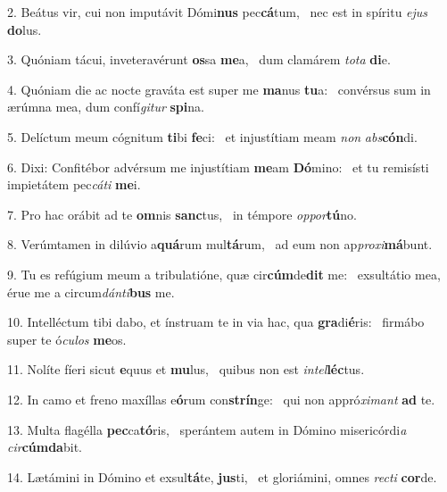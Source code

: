 2. Beátus vir, cui non imputávit Dómi\textbf{nus} pec\textbf{cá}tum, \ast\  nec est in spíritu \textit{e}\textit{jus} \textbf{do}lus.\

3. Quóniam tácui, inveteravérunt \textbf{os}sa \textbf{me}a, \ast\  dum clamárem \textit{to}\textit{ta} \textbf{di}e.\

4. Quóniam die ac nocte graváta est super me \textbf{ma}nus \textbf{tu}a: \ast\  convérsus sum in ærúmna mea, dum confí\textit{gi}\textit{tur} \textbf{spi}na.\

5. Delíctum meum cógnitum \textbf{ti}bi \textbf{fe}ci: \ast\  et injustítiam meam \textit{non} \textit{abs}\textbf{cón}di.\

6. Dixi: Confitébor advérsum me injustítiam \textbf{me}am \textbf{Dó}mino: \ast\  et tu remisísti impietátem pec\textit{cá}\textit{ti} \textbf{me}i.\

7. Pro hac orábit ad te \textbf{om}nis \textbf{sanc}tus, \ast\  in témpore \textit{op}\textit{por}\textbf{tú}no.\

8. Verúmtamen in dilúvio a\textbf{quá}rum mul\textbf{tá}rum, \ast\  ad eum non ap\textit{pro}\textit{xi}\textbf{má}bunt.\

9. Tu es refúgium meum a tribulatióne, quæ cir\textbf{cúm}de\textbf{dit} me: \ast\  exsultátio mea, érue me a circum\textit{dán}\textit{ti}\textbf{bus} me.\

10. Intelléctum tibi dabo, et ínstruam te in via hac, qua \textbf{gra}di\textbf{é}ris: \ast\  firmábo super te ó\textit{cu}\textit{los} \textbf{me}os.\

11. Nolíte fíeri sicut \textbf{e}quus et \textbf{mu}lus, \ast\  quibus non est \textit{in}\textit{tel}\textbf{léc}tus.\

12. In camo et freno maxíllas e\textbf{ó}rum con\textbf{strín}ge: \ast\  qui non appró\textit{xi}\textit{mant} \textbf{ad} te.\

13. Multa flagélla \textbf{pec}ca\textbf{tó}ris, \ast\  sperántem autem in Dómino misericórdi\textit{a} \textit{cir}\textbf{cúm}\textbf{da}bit.\

14. Lætámini in Dómino et exsul\textbf{tá}te, \textbf{jus}ti, \ast\  et gloriámini, omnes \textit{rec}\textit{ti} \textbf{cor}de.\

